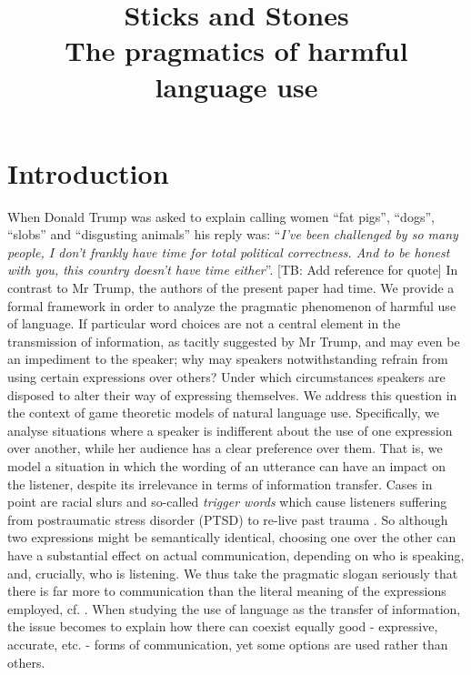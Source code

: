 \documentclass[10pt]{article}
\title{%
  Sticks and Stones \\
  \large The pragmatics of harmful language use}
\newcommand{\tb}[1]{\textcolor[rgb]{.8,.33,.0}{[TB: #1]}}%
\begin{document}
\maketitle

\section{Introduction}
When Donald Trump was asked to explain calling women ``fat pigs'', ``dogs'', ``slobs'' and ``disgusting animals'' his reply was: ``\textit{I’ve been challenged by so many people, I don’t frankly have time for total political correctness. And to be honest with you, this country doesn’t have time either}''. \tb{Add reference for quote}
In contrast to Mr Trump, the authors of the present paper had time. We provide a formal framework in order to analyze the pragmatic phenomenon of harmful use of language. If particular word choices are not a central element in the transmission of information, as tacitly suggested by Mr Trump, and may even be an impediment to the speaker; why may speakers notwithstanding refrain from using certain expressions over others? Under which circumstances speakers are disposed to alter their way of expressing themselves.  We address this question in the context of game theoretic models of natural language use.
Specifically, we analyse situations where a speaker is indifferent about the use of one expression over another, while her audience has a clear preference over them. That is, we model a situation in which the wording of an utterance can have an impact on the listener, despite its irrelevance in terms of information transfer. Cases in point are racial slurs and so-called \textit{trigger words} which cause listeners suffering from postraumatic stress disorder (PTSD) to re-live past trauma \cite{fagan2004confronting, yehuda2002post}. So although two expressions might be semantically identical, choosing one over the other can have a substantial effect on actual communication, depending on who is speaking, and, crucially, who is listening. We thus take the pragmatic slogan seriously that there is far more to communication than the literal meaning of the expressions employed, cf. \cite{grice1975logic}. %
When studying the use of language as the transfer of information, the issue becomes to explain how there can coexist equally good - expressive, accurate, etc. - forms of communication, yet some options are used rather than others.
\end{document}
